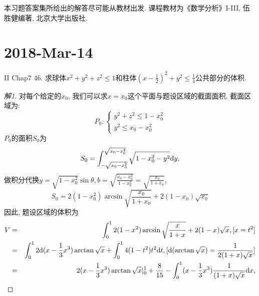 \documentclass[a4paper,12pt]{article}
\author{龙子超}
\title{{\heiti {\zihao{3} 数学分析II-习题课}}}
\date{}
\begin{document}
\maketitle
%


本习题答案集所给出的解答尽可能从教材出发. 课程教材为《数学分析》I-III, 伍胜健编著,
北京大学出版社.
\section*{2018-Mar-14}
\noindent II Chap7 46. 求球体$x^2+y^2+z^2\leq1$和柱体$(x-\frac{1}{2})^2+y^2\leq \frac{1}{4}$公共部分的体积.
\begin{proof}[解1]
  对每个给定的$x_0$, 我们可以求$x=x_0$这个平面与题设区域的截面面积. 截面区域为:
  \[P_0:\left\{\begin{array}{l}
    y^2+z^2\leq1-x_0^2\\
    y^2\leq x_0-x_0^2
  \end{array}
  \right.
    \]
    $P_0$的面积$S_0$为
    \[S_0=\int_{-\sqrt{x_0-x_0^2}}^{\sqrt{x_0-x_0^2}}\sqrt{1-x_0^2-y^2}\mathrm{d} y, \]
    做积分代换$y=\sqrt{1-x_0^2}\sin\theta,b=\sqrt{\frac{x_0-x_0^2}{1-x_0^2}}=\sqrt{\frac{x_0}{1+x_0}}$,
    \[S_0=2(1-x_0^2)\arcsin\sqrt{\frac{x_0}{1+x_0}}+2(1-x_0)\sqrt{x_0}\]
    因此, 题设区域的体积为
    \begin{eqnarray*}
      V&=&\int_0^1 2(1-x^2)\arcsin\sqrt{\frac{x}{1+x}}+2(1-x)\sqrt{x}, [x=t^2]\\
      &=&\int_0^12\mathrm{d}(x-\frac{1}{3}x^3)\arctan\sqrt{x}+\int_0^14(1-t^2)t^2\mathrm{d} t, [\mathrm{d}(\arctan\sqrt{x})=\frac{1}{2(1+x)\sqrt{x}}]\\
      &=&2(x-\frac{1}{3}x^3)\arctan\sqrt{x}|_0^1+\frac{8}{15}-\int_0^1(x-\frac{1}{3}x^3)\frac{1}{(1+x)\sqrt{x}}\mathrm{d} x,
    \end{eqnarray*}
\end{proof}




\end{document}
